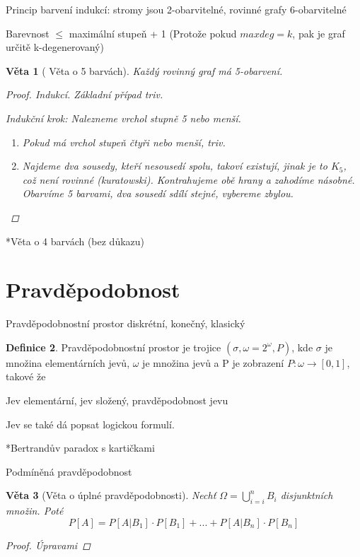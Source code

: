 \documentclass[10pt,a4paper]{article}
\theoremstyle{plain}
\newtheorem{veta}{Věta}
\theoremstyle{definition}
\newtheorem{definice}[veta]{Definice}
\begin{document}
Princip barvení indukcí: stromy jsou 2-obarvitelné, rovinné grafy 6-obarvitelné

Barevnost $\leq$ maximální stupeň + 1 (Protože pokud $max deg = k$, pak je graf určitě k-degenerovaný)


\begin{veta}[ Věta o 5 barvách]
Každý rovinný graf má 5-obarvení.
\begin{proof}
Indukcí. Základní případ triv.

Indukční krok: Nalezneme vrchol stupně 5 nebo menší. \begin{enumerate}
\item Pokud má vrchol stupeň čtyři nebo menší, triv.
\item Najdeme dva sousedy, kteří nesousedí spolu, takoví existují, jinak je to $K_5$, což není rovinné (kuratowski). Kontrahujeme obě hrany a zahodíme násobné. Obarvíme 5 barvami, dva sousedí sdílí stejné, vybereme zbylou.
\end{enumerate}
\end{proof}
\end{veta}

*Věta o 4 barvách (bez důkazu)

\section{Pravděpodobnost}

Pravděpodobnostní prostor diskrétní, konečný, klasický

\begin{definice}
Pravděpodobnostní prostor je trojice $(\sigma, \omega = 2^\omega, P)$, kde $\sigma$ je množina elementárních jevů, $\omega$ je množina jevů a P je zobrazení $P: \omega \to [0,1]$, takové že
\end{definice}

Jev elementární, jev složený, pravděpodobnost jevu

Jev se také dá popsat logickou formulí.

*Bertrandův paradox s kartičkami

Podmíněná pravděpodobnost

\begin{veta} [Věta o úplné pravděpodobnosti]
Nechť $\Omega = \bigcup^n_{i=i} B_i$ disjunktních množin.
Poté 
\[ P[A] = P[A|B_1]\cdot P[B_1] + ... + P[A|B_n]\cdot P[B_n]\]
\begin{proof}
Úpravami
\end{proof}
\end{veta} 
\end{document}

